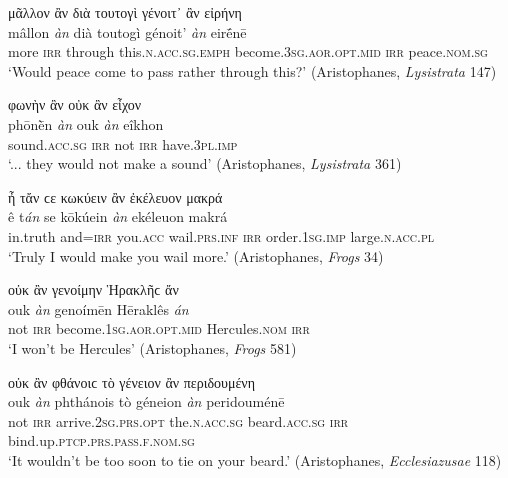 \begin{exe}
\ex μᾶλλον ἂν διὰ τουτογὶ γένοιτ᾽ ἂν εἰρήνη\\
\gll mâllon \emph{àn} dià toutogì génoit' \emph{àn} eirḗnē\\
more \textsc{irr} through this.\textsc{n.acc.sg.emph} become.\textsc{3sg.aor.opt.mid} \textsc{irr} peace.\textsc{nom.sg}\\
\trans `Would peace come to pass rather through this?' (Aristophanes, \textit{Lysistrata} 147)
\label{multian55}
\end{exe}

\begin{exe}
\ex φωνὴν ἂν οὐκ ἂν εἶχον\\
\gll phōnḕn \emph{àn} ouk \emph{àn} eîkhon\\
sound.\textsc{acc.sg} \textsc{irr} not \textsc{irr} have.\textsc{3pl.imp}\\
\trans `... they would not make a sound' (Aristophanes, \textit{Lysistrata} 361)
\label{multian56}
\end{exe}

\begin{exe}
\ex ἦ τἄν ϲε κωκύειν ἂν ἐκέλευον μακρά\\
\gll ê t\emph{án} se kōkúein \emph{àn} ekéleuon makrá\\
in.truth and=\textsc{irr} you.\textsc{acc} wail.\textsc{prs.inf} \textsc{irr} order.\textsc{1sg.imp} large.\textsc{n.acc.pl}\\
\trans `Truly I would make you wail more.' (Aristophanes, \textit{Frogs} 34)
\label{multian57}
\end{exe}

\begin{exe}
\ex οὐκ ἂν γενοίμην Ἡρακλῆϲ ἄν\\
\gll ouk \emph{àn} genoímēn Hēraklês \emph{án}\\
not \textsc{irr} become.\textsc{1sg.aor.opt.mid} Hercules.\textsc{nom} \textsc{irr}\\
\trans `I won't be Hercules' (Aristophanes, \textit{Frogs} 581)
\label{multian58}
\end{exe}

\begin{exe}
\ex οὐκ ἂν φθάνοιϲ τὸ γένειον ἂν περιδουμένη\\
\gll ouk \emph{àn} phthánois tò géneion \emph{àn} peridouménē\\
not \textsc{irr} arrive.\textsc{2sg.prs.opt} the.\textsc{n.acc.sg} beard.\textsc{acc.sg} \textsc{irr} bind.up\textsc{.ptcp.prs.pass.f.nom.sg}\\
\trans `It wouldn't be too soon to tie on your beard.' (Aristophanes, \textit{Ecclesiazusae} 118)
\label{multian59}
\end{exe}

